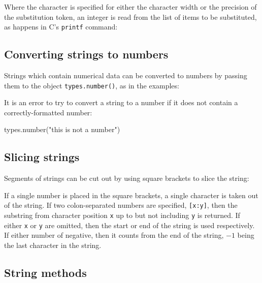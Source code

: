 Where the character {\tt *} is specified for either the character width or the
precision of the substitution token, an integer is read from the list of items
to be substituted, as happens in C's {\tt printf} command:

\vspace{3mm}

\vspace{3mm}

\subsection{Converting strings to numbers}

Strings which contain numerical data can be converted to numbers by passing
them to the object {\tt types.number()}, as in the examples:

\vspace{3mm}

\vspace{3mm}

\noindent It is an error to try to convert a string to a number if it does not contain a correctly-formatted number:

\begin{dontdo}
types.number("this is not a number")
\end{dontdo}

\subsection{Slicing strings}

Segments of strings can be cut out by using square brackets to slice the string:

\vspace{3mm}

\vspace{3mm}

\noindent If a single number is placed in the square brackets, a single
character is taken out of the string. If two colon-separated numbers are
specified, {\tt [x:y]}, then the substring from character position {\tt x} up to
but not including {\tt y} is returned. If either {\tt x} or {\tt y} are
omitted, then the start or end of the string is used respectively. If either
number of negative, then it counts from the end of the string, $-1$ being the
last character in the string.

\subsection{String methods}

